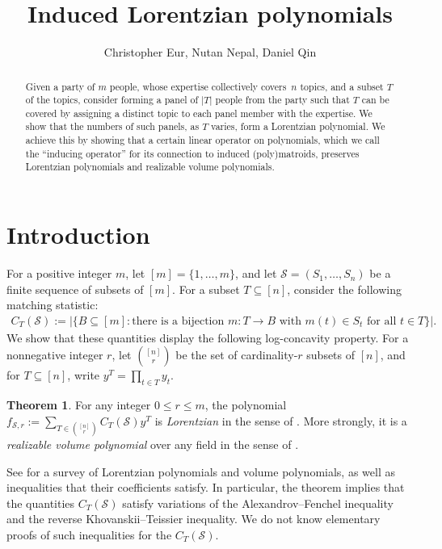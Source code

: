 \documentclass{amsart}
\title{Induced Lorentzian polynomials}
\author{Christopher Eur, Nutan Nepal, Daniel Qin}
\theoremstyle{plain}
\theoremstyle{definition}
\newtheorem{thm}{Theorem}[section]
\begin{document}
\maketitle

\vspace{-10pt}

\begin{abstract}
Given a party of $m$ people, whose expertise collectively covers~$n$ topics, and a subset $T$ of the topics, consider forming a panel of $|T|$ people from the party such that $T$ can be covered by assigning a distinct topic to each panel member with the expertise.
We show that the numbers of such panels, as $T$ varies, form a Lorentzian polynomial.  We achieve this by showing that a certain linear operator on polynomials, which we call the ``inducing operator'' for its connection to induced (poly)matroids, preserves Lorentzian polynomials and realizable volume polynomials.
\end{abstract}


\section{Introduction}

For a positive integer $m$, let $[m] = \{1, \dotsc, m\}$, and let $\mathcal S = (S_1, \dotsc, S_n)$ be a finite sequence of subsets of $[m]$.
For a subset $T \subseteq [n]$, consider the following matching statistic:
\begin{align*}
C_T(\mathcal S) := |\{B \subseteq [m] : \text{there is a bijection $m: T \to B$ with $m(t) \in S_t$ for all $t\in T$}\}|.
\end{align*}
We show that these quantities display the following log-concavity property.  For a nonnegative integer $r$, let $\binom{[n]}{r}$ be the set of cardinality-$r$ subsets of $[n]$, and for $T\subseteq [n]$, write $y^T = \prod_{t\in T} y_t$.

\begin{thm}\label{thm:main1}
For any integer $0\leq r \leq m$, the polynomial $f_{\mathcal S, r} := \sum_{T \in \binom{[n]}{r}}  C_T(\mathcal S) y^T$ is \emph{Lorentzian} in the sense of \cite{BH20}.  More strongly, it is a \emph{realizable volume polynomial} over any field in the sense of \cite{GHMSW2025volpres}.
\end{thm}

See \cite{Huh2026VolumePolynomials} for a survey of Lorentzian polynomials and volume polynomials, as well as inequalities that their coefficients satisfy.
In particular, the theorem implies that the quantities $C_T(\mathcal S)$ satisfy variations of the Alexandrov--Fenchel inequality and the reverse Khovanskii--Teissier inequality.
We do not know elementary proofs of such inequalities for the $C_T(\mathcal S)$.
\end{document}
